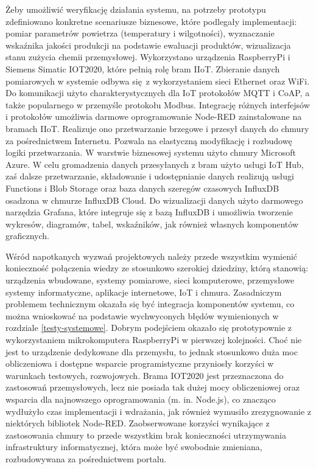 \documentclass[a4paper, 12pt, twoside]{article}
\begin{document}
Żeby umożliwić weryfikację działania systemu, 
na potrzeby prototypu zdefiniowano konkretne scenariusze biznesowe, które 
podlegały implementacji: pomiar parametrów powietrza (temperatury i wilgotności),
wyznaczanie wskaźnika jakości produkcji na podstawie ewaluacji produktów, 
wizualizacja stanu zużycia chemii przemysłowej. Wykorzystano urządzenia
RaspberryPi i Siemens Simatic IOT2020, które pełnią rolę bram IIoT. Zbieranie
danych pomiarowych w systemie odbywa się z wykorzystaniem sieci Ethernet oraz WiFi.
Do komunikacji użyto charakterystycznych dla IoT protokołów MQTT i CoAP, a także
popularnego w przemyśle protokołu Modbus. Integrację różnych interfejsów i protokołów
umożliwia darmowe oprogramowanie Node-RED zainstalowane na bramach IIoT. 
Realizuje ono przetwarzanie brzegowe i przesył danych do chmury za pośrednictwem Internetu.
Pozwala na elastyczną modyfikację i rozbudowę logiki przetwarzania.
W warstwie biznesowej systemu użyto chmury Microsoft Azure. W celu 
gromadzenia danych przesyłanych z bram użyto usługi IoT Hub, zaś dalsze
przetwarzanie, składowanie i udostępnianie danych realizują usługi Functions i Blob Storage
oraz baza danych szeregów czasowych InfluxDB osadzona w chmurze InfluxDB Cloud. 
Do wizualizacji danych użyto darmowego narzędzia Grafana, które integruje się z bazą InfluxDB i
umożliwia tworzenie wykresów, diagramów, tabel, wskaźników, jak również własnych
komponentów graficznych.

Wśród napotkanych wyzwań projektowych należy przede wszystkim wymienić konieczność
połączenia wiedzy ze stosunkowo szerokiej dziedziny, którą stanowią: urządzenia wbudowane, 
systemy pomiarowe, sieci komputerowe, przemysłowe systemy informatyczne, aplikacje internetowe, IoT i chmura. 
Zasadniczym problemem technicznym okazała się być integracja komponentów systemu, co 
można wnioskować na podstawie wychwyconych błędów wymienionych w rozdziale 
\ref{testy-systemowe}. Dobrym podejściem okazało się prototypownie z wykorzystaniem
mikrokomputera RaspberryPi w pierwszej kolejności. Choć nie jest to urządzenie 
dedykowane dla przemysłu, to jednak stosunkowo duża moc obliczeniowa i 
dostępne wsparcie programistyczne przyniosły korzyści w warunkach testowych, rozwojowych.
Brama IOT2020 jest przeznaczona do zastosowań przemysłowych, lecz nie posiada 
tak dużej mocy obliczeniowej oraz wsparcia dla najnowszego oprogramowania (m. in. Node.js),
co znacząco wydłużyło czas implementacji i wdrażania, jak również wymusiło 
zrezygnowanie z niektórych bibliotek Node-RED. Zaobserwowane korzyści wynikające
z zastosowania chmury to przede wszystkim brak konieczności utrzymywania infrastruktury
informatycznej, która może być swobodnie zmieniana, rozbudowywana za pośrednictwem
portalu.  
\end{document}
